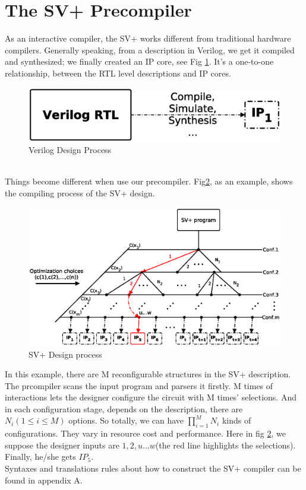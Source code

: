 \section{The SV+ Precompiler}\label{sec:compiler}
As an interactive compiler, the SV+ works different from traditional hardware compilers.
Generally speaking, from a description in Verilog, we get it compiled and synthesized; we finally created an IP core, see Fig \ref{fig-ipdesign}. It's a one-to-one relationship, between the RTL level descriptions and IP cores.
\begin{figure}[htbp]
\centering
\includegraphics[width=0.5\columnwidth]{IPDesign}
\caption{Verilog Design Process}
\label{fig-ipdesign}
\end{figure}
\\
Things become different when use our precompiler. Fig\ref{fig-compiler}, as an example, shows the compiling process of the SV+ design.   
\begin{figure}[htbp]
\centering
\includegraphics[scale=.4]{compileprocess}
\caption{SV+ Design process}
\label{fig-compiler}
\end{figure}
In this example, there are M reconfigurable structures in the SV+ description. The prcompiler scans the input program and parsers it firstly. M times of interactions lets the designer configure the circuit with M times' selections. And in each configuration stage, depends on the description, there are $N_i (1\leq i\leq M)$ options. So totally, we can have $\prod_{i=1}^{M}N_{i}$ kinds of configurations. They vary in resource cost and performance. Here in fig \ref{fig-compiler}, we suppose the designer inputs are $1,2,u...w$(the red line highlights the selections). Finally, he/she gets $\mathit{IP_5}$.
\\
Syntaxes and translations rules about how to construct the SV+ compiler can be found in appendix A.
